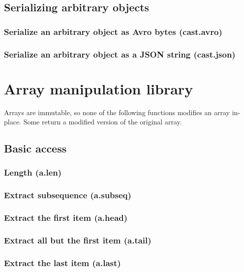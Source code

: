 \documentclass{article}
\theoremstyle{definition}
\begin{document}
\subsection{Serializing arbitrary objects}

\subsubsection{Serialize an arbitrary object as Avro bytes (cast.avro)}

\subsubsection{Serialize an arbitrary object as a JSON string (cast.json)}

\pagebreak

\section{Array manipulation library}

Arrays are immutable, so none of the following functions modifies an array in-place.  Some return a modified version of the original array.

\subsection{Basic access}

\subsubsection{Length (a.len)}

\subsubsection{Extract subsequence (a.subseq)}

\subsubsection{Extract the first item (a.head)}

\subsubsection{Extract all but the first item (a.tail)}

\subsubsection{Extract the last item (a.last)}
\end{document}
